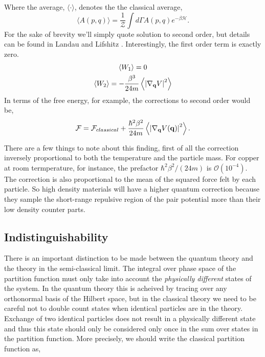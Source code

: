 Where the average, $\langle \cdot \rangle$, denotes the the classical average, 
\begin{equation}
    \langle A(p, q) \rangle = \frac{1}{\mathcal{Z}} 
        \int d\Gamma A(p, q) e^{-\beta \mathcal{H}}.
\end{equation}
For the sake of brevity we'll simply quote solution to second order, but details can be found in Landau and Lifshitz \cite{LANDAU198079}.
Interestingly, the first order term is exactly zero.
\begin{gather}
    \langle W_1 \rangle = 0 \\
    \langle W_2 \rangle = - \frac{\beta^3}{24 m} \left\langle \left\vert\nabla_{\mathbf{q}}V\right\vert^2 \right\rangle
\end{gather}
In terms of the free energy, for example, the corrections to second order would be, 
\begin{equation}{\label{quantumcorr}}
    \mathcal{F} = \mathcal{F}_{classical} + \frac{\hbar^2\beta^2}{24m}
        \left\langle \left\vert \nabla_{\mathbf{q}} V(\mathbf{q}) \right\vert^2 \right\rangle.
\end{equation}

There are a few things to note about this finding, first of all the correction inversely proportional to both the temperature and the particle mass.
For copper at room termperature, for instance, the prefactor $\hbar^2\beta^2/(24 m)$ is $\mathcal{O}(10^{-4})$. 
The correction is also proportional to the mean of the squared force felt by each particle. So high density materials will have a higher quantum correction because they sample the short-range repulsive region of the pair potential more than their low density counter parts.

\subsection{Indistinguishability}

There is an important distinction to be made between the quantum theory and the theory in the semi-classical limit.
The integral over phase space of the partition function must only take into account the \textit{physically different} states of the system.  
In the quantum theory this is acheived by tracing over any orthonormal basis of the Hilbert space, but in the classical theory we need to be careful not to double count states when identical particles are in the theory.
Exchange of two identical particles does not result in a physically different state and thus this state should only be considered only once in the sum over states in the partition function.
More precisely, we should write the classical partition function as,

